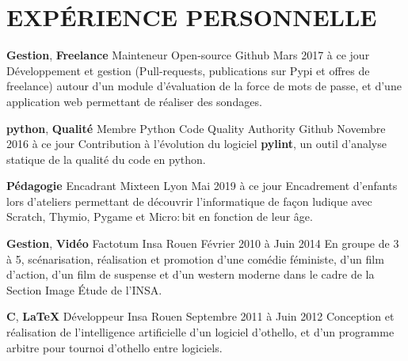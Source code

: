 \documentclass[11pt,a4paper]{moderncv}
\begin{document}
  \section{EXPÉRIENCE PERSONNELLE}

    \cventry
    {\textbf{Gestion}, \textbf{Freelance}}
    {Mainteneur}
    {Open-source}
    {Github}
    {Mars 2017 à ce jour}{
      Développement et gestion (Pull-requests, publications sur Pypi et offres de freelance)
	  autour d'un module d'évaluation de la force de mots de passe, et d'une application web permettant de réaliser des
	  sondages.
    }

    \cventry
    {\textbf{python}, \textbf{Qualité}}
    {Membre}
    {Python Code Quality Authority}
    {Github}
    {Novembre 2016 à ce jour}{
      Contribution à l'évolution du logiciel \textbf{pylint}, un outil d'analyse statique de la qualité du code
      en python.
    }

    \cventry
    {\textbf{Pédagogie}}
    {Encadrant}
    {Mixteen}
    {Lyon}
    {Mai 2019 à ce jour}{
      Encadrement d'enfants lors d'ateliers permettant de découvrir l’informatique de façon ludique avec
	  Scratch, Thymio, Pygame et Micro$:$bit en fonction de leur âge.
    }

    \cventry
    {\textbf{Gestion}, \textbf{Vidéo}}
    {Factotum}
    {Insa}
    {Rouen}
    {Février 2010 à Juin 2014}{
      En groupe de 3 à 5, scénarisation, réalisation et promotion d'une comédie
      féministe, d'un film d'action, d'un film de suspense et d'un western
      moderne dans le cadre de la Section Image Étude de l'INSA.
    }





    \cventry
    {\textbf{C}, \textbf{\LaTeX{}}}
    {Développeur}
    {Insa}
    {Rouen}
    {Septembre 2011 à Juin 2012}{
      Conception et réalisation de l'intelligence artificielle d'un logiciel
      d'othello, et d'un programme arbitre pour tournoi d'othello entre
      logiciels.
    }
\end{document}
